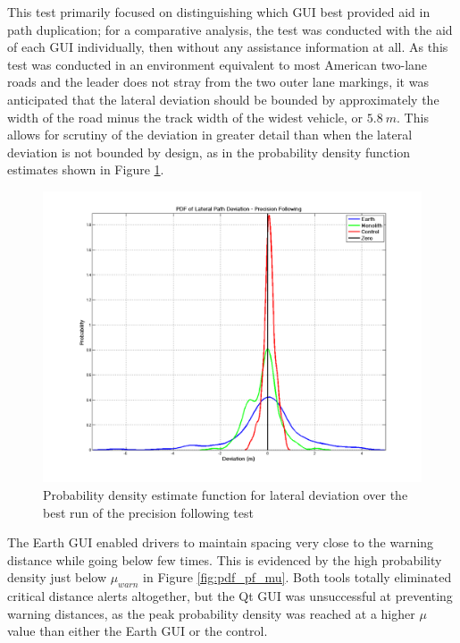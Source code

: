 \documentclass[twocolumn,10pt]{article}
\begin{document}
    This test primarily focused on distinguishing which GUI best provided aid in path duplication; for a comparative analysis, the test was conducted with the aid of each GUI individually, then without any assistance information at all.  As this test was conducted in an environment equivalent to most American two-lane roads and the leader does not stray from the two outer lane markings, it was anticipated that the lateral deviation should be bounded by approximately the width of the road minus the track width of the widest vehicle, or $5.8~m$.  This allows for scrutiny of the deviation in greater detail than when the lateral deviation is not bounded by design, as in the probability density function estimates shown in Figure \ref{fig:pdf_pf_dev}.

    \begin{figure}[ht] \centering
      \includegraphics[width=\columnwidth]{../graphics/pdf_precision_following_deviation.png}
      \caption{Probability density estimate function for lateral deviation over the best run of the precision following test}
      \label{fig:pdf_pf_dev}
    \end{figure}

    The Earth GUI enabled drivers to maintain spacing very close to the warning distance while going below few times. This is evidenced by the high probability density just below $\mu_{warn}$ in Figure \ref{fig:pdf_pf_mu}. Both tools totally eliminated critical distance alerts altogether, but the Qt GUI was unsuccessful at preventing warning distances, as the peak probability density was reached at a higher $\mu$ value than either the Earth GUI or the control.
    
\end{document}
